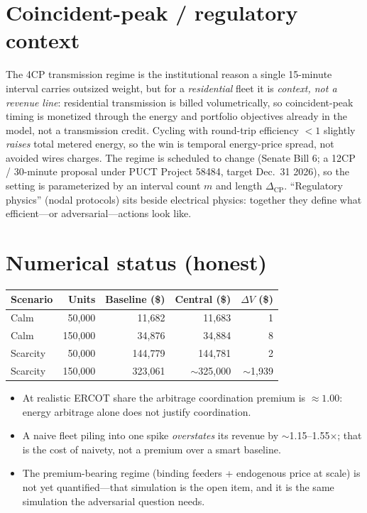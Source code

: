\documentclass[11pt]{article}
\begin{document}
\section{Coincident-peak / regulatory context}

The 4CP transmission regime is the institutional reason a single 15-minute
interval carries outsized weight, but for a \emph{residential} fleet it is
\emph{context, not a revenue line}: residential transmission is billed
volumetrically, so coincident-peak timing is monetized through the energy and
portfolio objectives already in the model, not a transmission credit. Cycling
with round-trip efficiency $<1$ slightly \emph{raises} total metered energy, so
the win is temporal energy-price spread, not avoided wires charges. The regime
is scheduled to change (Senate Bill 6; a 12CP / 30-minute proposal under PUCT
Project 58484, target Dec.~31 2026), so the setting is parameterized by an
interval count $m$ and length $\Delta_{\mathrm{CP}}$. ``Regulatory physics''
(nodal protocols) sits beside electrical physics: together they define what
efficient---or adversarial---actions look like.

\section{Numerical status (honest)}

\begin{center}
\begin{tabular}{@{}lrrrr@{}}
\toprule
Scenario & Units & Baseline (\$) & Central (\$) & $\Delta V$ (\$)\\
\midrule
Calm & 50{,}000 & 11{,}682 & 11{,}683 & 1\\
Calm & 150{,}000 & 34{,}876 & 34{,}884 & 8\\
Scarcity & 50{,}000 & 144{,}779 & 144{,}781 & 2\\
Scarcity & 150{,}000 & 323{,}061 & $\sim$325{,}000 & $\sim$1{,}939\\
\bottomrule
\end{tabular}
\end{center}

\begin{itemize}
\item At realistic ERCOT share the arbitrage coordination premium is
\textbf{$\approx1.00$}: energy arbitrage alone does not justify coordination.
\item A naive fleet piling into one spike \emph{overstates} its revenue by
$\sim$1.15--1.55$\times$; that is the cost of naivety, not a premium over a
smart baseline.
\item The premium-bearing regime (binding feeders + endogenous price at scale)
is not yet quantified---that simulation is the open item, and it is the same
simulation the adversarial question needs.
\end{itemize}
\end{document}

